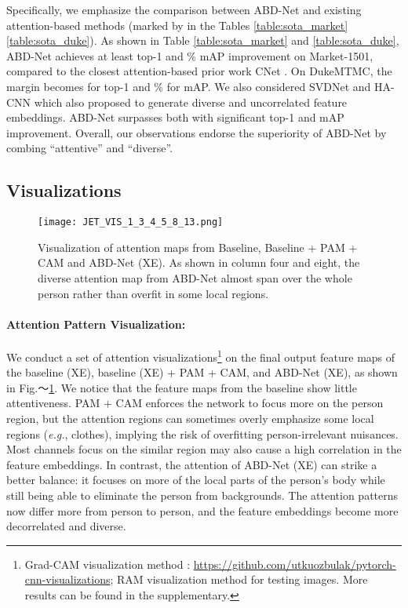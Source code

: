 \documentclass[10pt,twocolumn]{article}
\begin{document}
Specifically, we emphasize the comparison between ABD-Net and existing attention-based methods (marked by  in the Tables \ref{table:sota_market}  \ref{table:sota_duke}). As shown in Table \ref{table:sota_market} and \ref{table:sota_duke}, ABD-Net achieves at least  top-1 and \% mAP improvement on Market-1501, compared to the closest attention-based prior work CNet \cite{Liu_2018}. On DukeMTMC, the margin becomes  for top-1 and \% for mAP. We also considered SVDNet \cite{Sun_2017} and HA-CNN \cite{Li_2018} which also proposed to generate diverse and uncorrelated feature embeddings. ABD-Net surpasses both with significant top-1 and mAP improvement. Overall, our observations endorse the superiority of ABD-Net by combing ``attentive'' and ``diverse''. 





\subsection{Visualizations}


\begin{figure}[t]
\begin{center}
   \texttt{[image: JET\_VIS\_1\_3\_4\_5\_8\_13.png]}
\end{center}
   \caption{Visualization of attention maps from Baseline, Baseline + PAM + CAM and ABD-Net (XE). As shown in column four and eight, the diverse attention map from ABD-Net almost span over the whole person rather than overfit in some local regions.}
\label{fig:visf}
\vspace{-1mm}
\end{figure}

\paragraph{Attention Pattern Visualization:} We conduct a set of attention visualizations\footnote{Grad-CAM visualization method \cite{Selvaraju_2017}: \url{https://github.com/utkuozbulak/pytorch-cnn-visualizations}; RAM visualization method \cite{Yang_2019_CVPR} for testing images. More results can be found in the supplementary.} on the final output feature maps of the baseline (XE), baseline (XE) + PAM + CAM, and ABD-Net (XE), as shown in Fig.～\ref{fig:visf}. We notice that the feature maps from the baseline show little attentiveness. PAM + CAM enforces the network to focus more on the person region, but the attention regions can sometimes overly emphasize some local regions (\textit{e.g.}, clothes), implying the risk of overfitting person-irrelevant nuisances. Most channels focus on the similar region may also cause a high correlation in the feature embeddings. In contrast, the attention of ABD-Net (XE) can strike a better balance: it focuses on more of the local parts of the person's body while still being able to eliminate the person from backgrounds. The attention patterns now differ more from person to person, and the feature embeddings become more decorrelated and diverse. 
\end{document}
